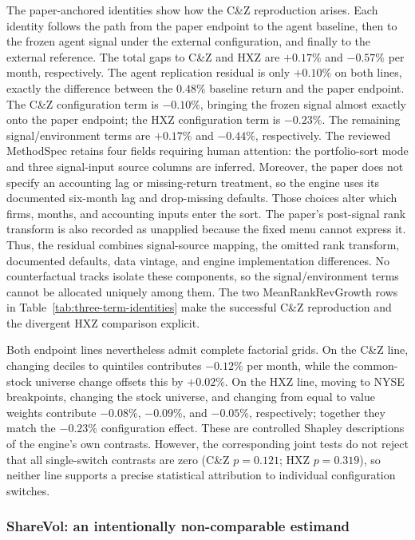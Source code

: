 The paper-anchored identities show how the C\&Z reproduction arises. Each identity follows the path from the paper endpoint to the
agent baseline, then to the frozen agent signal under the external
configuration, and finally to the external reference. The total gaps to C\&Z
and HXZ are $+0.17\%$ and $-0.57\%$ per month, respectively. The agent
replication residual is only $+0.10\%$ on both lines, exactly the difference
between the $0.48\%$ baseline return and the paper endpoint. The C\&Z
configuration term is $-0.10\%$, bringing the frozen signal almost exactly
onto the paper endpoint; the HXZ configuration term is $-0.23\%$. The
remaining signal/environment terms are $+0.17\%$ and $-0.44\%$,
respectively. The reviewed
MethodSpec retains four fields requiring human attention: the portfolio-sort
mode and three signal-input source columns are inferred. Moreover, the paper
does not specify an accounting lag or missing-return treatment, so the engine
uses its documented six-month lag and drop-missing defaults. Those choices
alter which firms, months, and accounting inputs enter the sort. The paper's
post-signal rank transform is also recorded as unapplied because the fixed
menu cannot express it. Thus, the residual combines signal-source mapping,
the omitted rank transform, documented defaults, data vintage, and engine
implementation differences. No counterfactual tracks isolate these components,
so the signal/environment terms cannot be allocated uniquely among them. The
two MeanRankRevGrowth rows in Table~\ref{tab:three-term-identities} make the
successful C\&Z reproduction and the divergent HXZ comparison explicit.

Both endpoint lines nevertheless admit complete factorial grids. On the C\&Z
line, changing deciles to quintiles contributes $-0.12\%$ per month, while
the common-stock universe change offsets this by $+0.02\%$. On the HXZ line,
moving to NYSE breakpoints, changing the stock universe, and changing from
equal to value weights contribute $-0.08\%$, $-0.09\%$, and $-0.05\%$,
respectively; together they match the $-0.23\%$ configuration effect. These
are controlled Shapley descriptions of the engine's own contrasts. However,
the corresponding joint tests do not reject that all single-switch contrasts
are zero (C\&Z $p=0.121$; HXZ $p=0.319$), so neither line supports a precise
statistical attribution to individual configuration switches.


\subsubsection{ShareVol: an intentionally non-comparable estimand}


